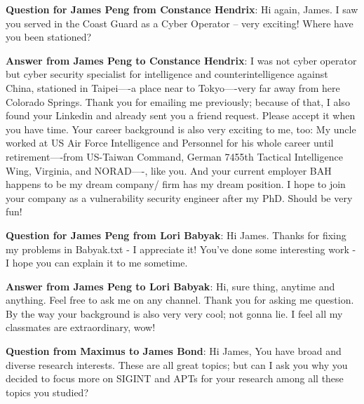 \textbf{Question for James Peng from Constance Hendrix}:  Hi again, James.  I saw you served in the Coast Guard as a Cyber Operator -- very exciting!  Where have you been stationed?

\textbf{Answer from James Peng to Constance Hendrix}:  I was not cyber operator but cyber security specialist for intelligence and counterintelligence against China, stationed in Taipei----a place near to Tokyo----very far away from here Colorado Springs. Thank you for emailing me previously; because of that, I also found your Linkedin and already sent you a friend request. Please accept it when you have time. Your career background is also very exciting to me, too: My uncle worked at US Air Force Intelligence and Personnel for his whole career until retirement----from US-Taiwan Command, German 7455th Tactical Intelligence Wing, Virginia, and NORAD----, like you. And your current employer BAH happens to be my dream company/ firm has my dream position. I hope to join your company as a vulnerability security engineer after my PhD. Should be very fun!   

\textbf{Question for James Peng from Lori Babyak}:  Hi James. Thanks for fixing my problems in Babyak.txt - I appreciate it!  You've done some interesting work - I hope you can explain it to me sometime.

\textbf{Answer from James Peng to Lori Babyak}:  Hi, sure thing, anytime and anything. Feel free to ask me on any channel. Thank you for asking me question. By the way your background is also very very cool; not gonna lie. I feel all my classmates are extraordinary, wow!

\textbf{Question from Maximus to James Bond}: Hi James, You have broad and diverse research interests. These are all great topics; but can I ask you why you decided to focus more on SIGINT and APTs for your research among all these topics you studied? 
